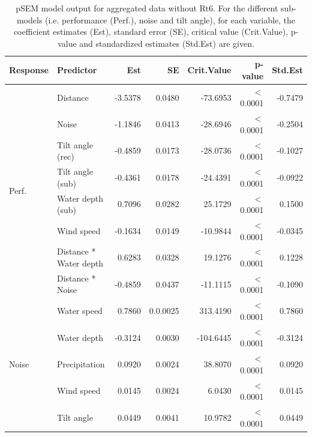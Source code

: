\documentclass[doublespacing,linenumbers]{bmcart}
\begin{document}
\begin{backmatter}
\begin{table}[]
\centering
\caption{pSEM model output for aggregated data without Rt6. For the different sub-models (i.e. performance (Perf.), noise and tilt angle), for each variable, the coefficient estimates (Est), standard error (SE), critical value (Crit.Value), p-value and standardized estimates (Std.Est) are given.}
\begin{tabular}{llrrrrr}
\hline
Response                       & Predictor               & Est     & SE     & Crit.Value   & p-value      & Std.Est \\ \hline
\multirow{8}{*}{Perf.} & Distance                & -3.5378 & 0.0480 & -73.6953 & $<$0.0001            & -0.7479 \\
                               & Noise                   & -1.1846 & 0.0413 & -28.6946 & $<$0.0001            & -0.2504 \\
                               & Tilt angle (rec)        & -0.4859 & 0.0173 & -28.0736 & $<$0.0001            & -0.1027 \\
                               & Tilt angle (sub)        & -0.4361 & 0.0178 & -24.4391 & $<$0.0001            & -0.0922 \\
                               & Water depth (sub)      & 0.7096  & 0.0282 & 25.1729  & $<$0.0001            & 0.1500    \\
                               & Wind speed              & -0.1634 & 0.0149 & -10.9844 & $<$0.0001            & -0.0345 \\
                               & Distance * Water depth & 0.6283  & 0.0328 & 19.1276  & $<$0.0001            & 0.1228  \\
                               & Distance * Noise        & -0.4859 & 0.0437 & -11.1115 & $<$0.0001            & -0.1090  \\ \hline
\multirow{7}{*}{Noise}         & Water speed          & 0.7860  & 0.0.0025 & 313.4190 & $<$0.0001            & 0.7860  \\
                               & Water depth            & -0.3124 & 0.0030 & -104.6445 & $<$0.0001            & -0.3124 \\
                               & Precipitation           & 0.0920  & 0.0024 & 38.8070  & $<$0.0001            & 0.0920  \\
                               & Wind speed              & 0.0145  & 0.0024 & 6.0430   & $<$0.0001            & 0.0145  \\
                               & Tilt angle              & 0.0449 & 0.0041 & 10.9782  & $<$0.0001            & 0.0449\\

\end{tabular}
\end{table}
\end{backmatter}
\end{document}
